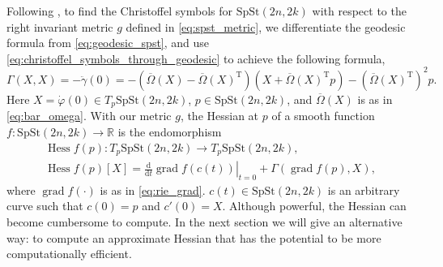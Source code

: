 Following \cite[p.~10]{JensenZimmermann2024}, to find the Christoffel symbols for $\mathrm{SpSt}(2n, 2k)$ with respect to the right invariant metric $g$ defined in \eqref{eq:spst_metric}, we differentiate the geodesic formula from \eqref{eq:geodesic_spst}, and use \eqref{eq:christoffel_symbols_through_geodesic} to achieve the following formula,
\begin{equation*}
    \Gamma(X,X)=-\ddot{\gamma}(0)=-(\overline{\Omega}(X)-\overline{\Omega}(X)^{\mathrm{T}})(X+\overline{\Omega}(X)^{\mathrm{T}}p)-(\overline{\Omega}(X)^{\mathrm{T}})^{2}p.
\end{equation*}
Here $X=\dot{\varphi}(0)\in T_{p}\mathrm{SpSt}(2n, 2k)$, $p\in \mathrm{SpSt}(2n, 2k)$, and $\overline{\Omega}(X)$ is as in \eqref{eq:bar_omega}. 
With our metric $g$, the Hessian at $p$ of a smooth function $f\colon \mathrm{SpSt}(2n, 2k)\xrightarrow{}\mathbb{R}$ is the endomorphism 
\begin{equation}\label{eq:riemannian_hessian}
    \begin{gathered}
        \operatorname{Hess}f(p)\colon T_{p}\mathrm{SpSt}(2n, 2k)\xrightarrow{}T_{p}\mathrm{SpSt}(2n, 2k),  \\
        \operatorname{Hess}f(p)[X]=\left.\frac{\mathrm{d}}{\mathrm{d}t}\operatorname{grad}f(c(t))\right|_{t=0}+\Gamma(\operatorname{grad}f(p),X),
    \end{gathered}
\end{equation}
where $\operatorname{grad}f(\cdot)$ is as in \eqref{eq:rie_grad}. $c(t)\in \mathrm{SpSt}(2n, 2k)$ is an arbitrary curve such that $c(0)=p$ and $c'(0)=X$. 
Although powerful, the Hessian can become cumbersome to compute. In the next section we will give an alternative way: to compute an approximate Hessian that has the potential to be more computationally efficient. 